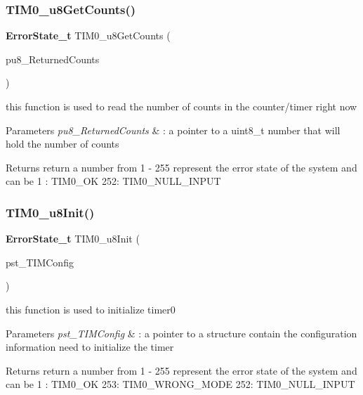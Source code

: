 \subsubsection{T\+I\+M0\+\_\+u8\+Get\+Counts()}
{\footnotesize\ttfamily \textbf{ Error\+State\+\_\+t} T\+I\+M0\+\_\+u8\+Get\+Counts (\begin{DoxyParamCaption}\item[{\textbf{ uint8\+\_\+t} $\ast$}]{pu8\+\_\+\+Returned\+Counts }\end{DoxyParamCaption})}



this function is used to read the number of counts in the counter/timer right now 


\begin{DoxyParams}{Parameters}
{\em pu8\+\_\+\+Returned\+Counts} & \+: a pointer to a uint8\+\_\+t number that will hold the number of counts \\
\hline
\end{DoxyParams}
\begin{DoxyReturn}{Returns}
return a number from 1 -\/ 255 represent the error state of the system and can be 1 \+: T\+I\+M0\+\_\+\+OK 252\+: T\+I\+M0\+\_\+\+N\+U\+L\+L\+\_\+\+I\+N\+P\+UT 
\end{DoxyReturn}
\mbox{\label{_t_i_m_e_r0__interface_8h_a7411543d6d0d589f6b5fa318bcf59d88}} 
\subsubsection{T\+I\+M0\+\_\+u8\+Init()}
{\footnotesize\ttfamily \textbf{ Error\+State\+\_\+t} T\+I\+M0\+\_\+u8\+Init (\begin{DoxyParamCaption}\item[{\textbf{ T\+I\+M0\+\_\+\+Config\+\_\+t} $\ast$}]{pst\+\_\+\+T\+I\+M\+Config }\end{DoxyParamCaption})}



this function is used to initialize timer0 


\begin{DoxyParams}{Parameters}
{\em pst\+\_\+\+T\+I\+M\+Config} & \+: a pointer to a structure contain the configuration information need to initialize the timer \\
\hline
\end{DoxyParams}
\begin{DoxyReturn}{Returns}
return a number from 1 -\/ 255 represent the error state of the system and can be 1 \+: T\+I\+M0\+\_\+\+OK 253\+: T\+I\+M0\+\_\+\+W\+R\+O\+N\+G\+\_\+\+M\+O\+DE 252\+: T\+I\+M0\+\_\+\+N\+U\+L\+L\+\_\+\+I\+N\+P\+UT 
\end{DoxyReturn}
\mbox{\label{_t_i_m_e_r0__interface_8h_a689d58acea491f346ef7ea249f7c98e0}} 
